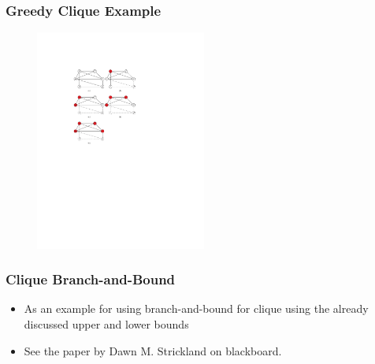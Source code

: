 \documentclass{beamer}
\begin{document}
\begin{frame}
  \frametitle{Greedy Clique Example}
  \begin{figure}[h]
    \centering
\includegraphics[width=0.5\textwidth]{coping-figs/greedy-clique}
  \end{figure}
\end{frame}

  
\begin{frame}
  \frametitle{Clique Branch-and-Bound}
  \begin{itemize}
  \item As an example for using branch-and-bound for clique using the already discussed upper and lower bounds
  \item See the paper by Dawn M. Strickland on blackboard.
  \end{itemize}
\end{frame}
\end{document}
